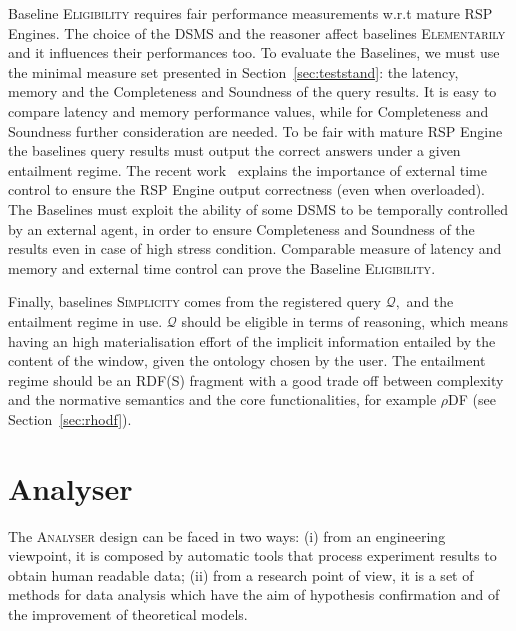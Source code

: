 Baseline \textsc{Eligibility} requires fair performance measurements w.r.t mature RSP Engines. The choice of the DSMS and the reasoner affect baselines \textsc{Elementarily} and it influences their performances too. To evaluate the Baselines, we must use the minimal measure set presented in Section~\ref{sec:teststand}: the latency, memory and the Completeness and Soundness of the query results. It is easy to compare latency and memory performance values, while for Completeness and Soundness further consideration are needed. To be fair with mature RSP Engine the baselines query results must output the correct answers under a given entailment regime. The recent work~\cite{DBLP:conf/semweb/DellAglioCBCV13} explains the importance of external time control  to ensure the RSP Engine output correctness (even when overloaded). The Baselines must exploit the ability of some DSMS to be temporally controlled by an external agent, in order to ensure Completeness and Soundness of the results even in case of high stress condition. Comparable measure of latency and memory and external time control can  prove the Baseline \textsc{Eligibility}.

Finally, baselines \textsc{Simplicity} comes from the registered query $\mathcal{Q},$ and the entailment regime in use. $\mathcal{Q}$ should be eligible in terms of reasoning, which means having an high materialisation effort of the implicit information entailed by the content of the window, given the ontology chosen by the user. The entailment regime should be an RDF(S) fragment with a good trade off between complexity and the normative semantics and the core functionalities, for example $\rho$DF (see Section~\ref{sec:rhodf}). %

\section{Analyser}\label{sec:analyser}

The \textsc{Analyser} design can be faced in two ways: (i) from an engineering viewpoint, it is composed by automatic tools that process experiment results to obtain human readable data; (ii) from a research point of view, it is a set of methods for data analysis which have the aim of hypothesis confirmation and of the improvement of theoretical models.



